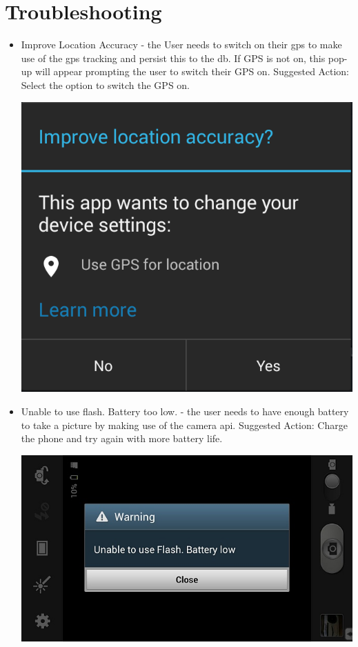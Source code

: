 \documentclass[11pt,a4paper,titlepage]{article}
\begin{document}
\section{Troubleshooting}
	\begin{itemize}
		\item Improve Location Accuracy - the User needs to switch on their gps to make use of the gps tracking and persist this to the db. If GPS is not on, this pop-up will appear prompting the user to switch their GPS on. \newline
		Suggested Action: Select the option to switch the GPS on. \newline
		
		\begin{center}
				\includegraphics[scale=0.3]{CAPTURE}
		\end{center}
		
		\item Unable to use flash. Battery too low. - the user needs to have enough battery to take a picture by making use of the camera api. \newline
		Suggested Action: Charge the phone and try again with more battery life. \newline
		
		\begin{center}
				\includegraphics[scale=0.3]{Battery_Low}
		\end{center}
	\end{itemize}
\end{document}
